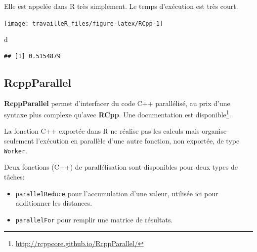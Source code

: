 \documentclass[
  12pt,
  french,
  a4paper,
  extrafontsizes,onecolumn,openright
  ]{memoir}
\newenvironment{Shaded}{\begin{snugshade}}{\end{snugshade}}
\newcommand{\FunctionTok}[1]{\textcolor[rgb]{0.13,0.29,0.53}{\textbf{#1}}}
\newcommand{\NormalTok}[1]{#1}
\newcommand{\OtherTok}[1]{\textcolor[rgb]{0.56,0.35,0.01}{#1}}
\newcommand{\SpecialCharTok}[1]{\textcolor[rgb]{0.81,0.36,0.00}{\textbf{#1}}}
\providecommand{\tightlist}{%
  \setlength{\itemsep}{0pt}\setlength{\parskip}{0pt}}
\newlength{\rf}
\begin{document}
\normalsize

Elle est appelée dans R très simplement.
Le temps d'exécution est très court.

\scriptsize

\begin{Shaded}
\end{Shaded}

\begin{center}\texttt{[image: travailleR\_files/figure-latex/RCpp-1]} \end{center}

\begin{Shaded}
\begin{Highlighting}[]
\NormalTok{d}
\end{Highlighting}
\end{Shaded}

\begin{verbatim}
## [1] 0.5154879
\end{verbatim}

\normalsize

\subsection{RcppParallel}\label{rcppparallel}

\textbf{RcppParallel} permet d'interfacer du code C++ parallélisé, au prix d'une syntaxe plus complexe qu'avec \textbf{RCpp}.
Une documentation est disponible\footnote{\url{http://rcppcore.github.io/RcppParallel/}}.

La fonction C++ exportée dans R ne réalise pas les calculs mais organise seulement l'exécution en parallèle d'une autre fonction, non exportée, de type \texttt{Worker}.

Deux fonctions (C++) de parallélisation sont disponibles pour deux types de tâches:

\begin{itemize}
\tightlist
\item
  \texttt{parallelReduce} pour l'accumulation d'une valeur, utilisée ici pour additionner les distances.
\item
  \texttt{parallelFor} pour remplir une matrice de résultats.
\end{itemize}
\end{document}
